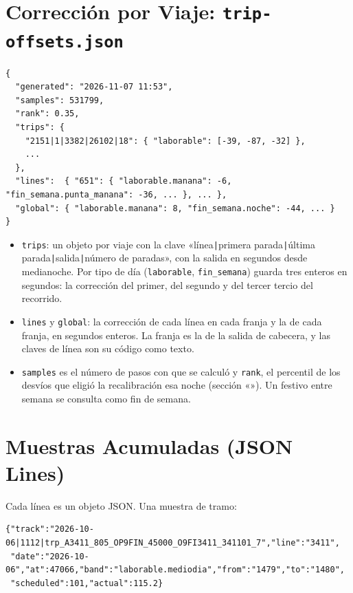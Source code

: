 \section{Corrección por Viaje: \texttt{trip-offsets.json}}

\begin{lstlisting}[numbers=none]
{
  "generated": "2026-11-07 11:53",
  "samples": 531799,
  "rank": 0.35,
  "trips": {
    "2151|1|3382|26102|18": { "laborable": [-39, -87, -32] },
    ...
  },
  "lines":  { "651": { "laborable.manana": -6, "fin_semana.punta_manana": -36, ... }, ... },
  "global": { "laborable.manana": 8, "fin_semana.noche": -44, ... }
}
\end{lstlisting}

\begin{itemize}
  \item \texttt{trips}: un objeto por viaje con la clave «línea\texttt{|}primera parada\texttt{|}última
        parada\texttt{|}salida\texttt{|}número de paradas», con la salida en segundos desde medianoche. Por tipo de día
        (\texttt{laborable}, \texttt{fin\_semana}) guarda tres enteros en segundos: la corrección del primer, del
        segundo y del tercer tercio del recorrido.
  \item \texttt{lines} y \texttt{global}: la corrección de cada línea en cada franja y la de cada franja, en segundos
        enteros. La franja es la de la salida de cabecera, y las claves de línea son su código como texto.
  \item \texttt{samples} es el número de pasos con que se calculó y \texttt{rank}, el percentil de los desvíos que
        eligió la recalibración esa noche (sección «»). Un festivo entre semana se
        consulta como fin de semana.
\end{itemize}

\section{Muestras Acumuladas (JSON Lines)}

Cada línea es un objeto JSON. Una muestra de tramo:

\begin{lstlisting}[numbers=none]
{"track":"2026-10-06|1112|trp_A3411_805_OP9FIN_45000_O9FI3411_341101_7","line":"3411",
 "date":"2026-10-06","at":47066,"band":"laborable.mediodia","from":"1479","to":"1480",
 "scheduled":101,"actual":115.2}
\end{lstlisting}

